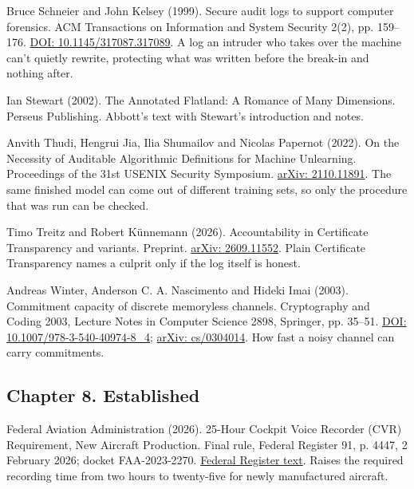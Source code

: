 \noindent Bruce Schneier and John Kelsey (1999). Secure audit logs to support computer forensics. ACM Transactions on Information and System Security 2(2), pp. 159--176. \href{https://doi.org/10.1145/317087.317089}{DOI: 10.1145/317087.317089}. A log an intruder who takes over the machine can't quietly rewrite, protecting what was written before the break-in and nothing after.
\par\medskip

\noindent Ian Stewart (2002). The Annotated Flatland: A Romance of Many Dimensions. Perseus Publishing. Abbott's text with Stewart's introduction and notes.
\par\medskip

\noindent Anvith Thudi, Hengrui Jia, Ilia Shumailov and Nicolas Papernot (2022). On the Necessity of Auditable Algorithmic Definitions for Machine Unlearning. Proceedings of the 31st USENIX Security Symposium. \href{https://arxiv.org/abs/2110.11891}{arXiv: 2110.11891}. The same finished model can come out of different training sets, so only the procedure that was run can be checked.
\par\medskip

\noindent Timo Treitz and Robert K\"unnemann (2026). Accountability in Certificate Transparency and variants. Preprint. \href{https://arxiv.org/abs/2609.11552}{arXiv: 2609.11552}. Plain Certificate Transparency names a culprit only if the log itself is honest.
\par\medskip

\noindent Andreas Winter, Anderson C. A. Nascimento and Hideki Imai (2003). Commitment capacity of discrete memoryless channels. Cryptography and Coding 2003, Lecture Notes in Computer Science 2898, Springer, pp. 35--51. \href{https://doi.org/10.1007/978-3-540-40974-8_4}{DOI: 10.1007/978-3-540-40974-8\_4}; \href{https://arxiv.org/abs/cs/0304014}{arXiv: cs/0304014}. How fast a noisy channel can carry commitments.
\par\medskip

\subsection*{Chapter 8. Established}

\noindent Federal Aviation Administration (2026). 25-Hour Cockpit Voice Recorder (CVR) Requirement, New Aircraft Production. Final rule, Federal Register 91, p. 4447, 2 February 2026; docket FAA-2023-2270. \href{https://www.govinfo.gov/content/pkg/FR-2026-02-02/html/2026-02110.htm}{Federal Register text}. Raises the required recording time from two hours to twenty-five for newly manufactured aircraft.
\par\medskip

